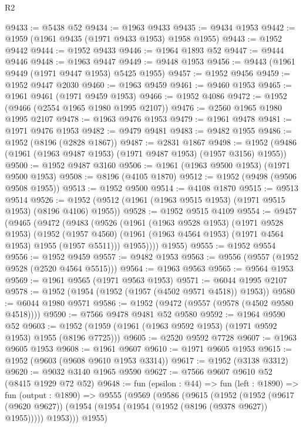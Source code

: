 \begin{lexlean}{R2}
\begin{coremodule}
@9433 := @5438 @52
@9434 := @1963 @9433
@9435 := @9434 @1953
@9442 := @1959 (@1961 @9435 (@1971 @9433 @1953) @1958 @1955)
@9443 := @1952 @9442
@9444 := @1952 @9433
@9446 := @1964 @1893 @52
@9447 := @9444 @9446
@9448 := @1963 @9447
@9449 := @9448 @1953
@9456 := @9443 (@1961 @9449 (@1971 @9447 @1953) @5425 @1955)
@9457 := @1952 @9456
@9459 := @1952 @9447 @2030
@9460 := @1963 @9459
@9461 := @9460 @1953
@9465 := @1961 @9461 (@1971 @9459 @1953)
@9466 := @1952 @4086
@9472 := @1952 (@9466 (@2554 @1965 @1980 @1995 @2107))
@9476 := @2560 @1965 @1980 @1995 @2107
@9478 := @1963 @9476 @1953
@9479 := @1961 @9478
@9481 := @1971 @9476 @1953
@9482 := @9479 @9481
@9483 := @9482 @1955
@9486 := @1952 (@8196 (@2828 @1867))
@9487 := @2831 @1867
@9498 := @1952 (@9486 (@1961 (@1963 @9487 @1953) (@1971 @9487 @1953) (@1957 @3156) @1955))
@9500 := @1952 @9487 @3160
@9506 := @1961 (@1963 @9500 @1953) (@1971 @9500 @1953)
@9508 := @8196 (@4105 @1870)
@9512 := @1952 (@9498 (@9506 @9508 @1955))
@9513 := @1952 @9500
@9514 := @4108 @1870
@9515 := @9513 @9514
@9526 := @1952 (@9512 (@1961 (@1963 @9515 @1953) (@1971 @9515 @1953) (@8196 @4106) @1955))
@9528 := @1952 @9515 @4109
@9554 := @9457
    (@9465
      (@9472
        (@9483
          (@9526
            (@1961
              (@1963 @9528 @1953)
              (@1971 @9528 @1953)
              (@1952
                (@1957 @4560)
                (@1961 (@1963 @4564 @1953) (@1971 @4564 @1953) @1955 (@1957 @5511)))
              @1955))))
      @1955)
@9555 := @1952 @9554
@9556 := @1952 @9459
@9557 := @9482 @1953
@9563 := @9556 (@9557 (@1952 @9528 (@2520 @4564 @5515)))
@9564 := @1963 @9563
@9565 := @9564 @1953
@9569 := @1961 @9565 (@1971 @9563 @1953)
@9571 := @6044 @1995 @2107
@9578 := @1952 (@1954 (@1952 (@1957 (@4502 @9571 @4518)) @1953))
@9580 := @6044 @1980 @9571
@9586 := @1952 (@9472 (@9557 (@9578 (@4502 @9580 @4518))))
@9590 := @7566 @9478 @9481 @52 @9580
@9592 := @1964 @9590 @52
@9603 := @1952 (@1959 (@1961 (@1963 @9592 @1953) (@1971 @9592 @1953) @1955 (@8196 @7725)))
@9605 := @2520 @9592 @7728
@9607 := @1963 @9605 @1953
@9608 := @1961 @9607
@9610 := @1971 @9605 @1953
@9615 := @1952 (@9603 (@9608 @9610 @1953 @3314))
@9617 := @1952 (@3138 @3312)
@9620 := @9032 @3140 @1965 @9590
@9627 := @7566 @9607 @9610 @52 (@8415 @1929 @72 @52)
@9648 := fun (epsilon : @44) =>
  fun (left : @1890) =>
  fun (output : @1890) =>
  @9555
    (@9569
      (@9586
        (@9615
          (@1952
            (@1952
              (@9617 (@9620 @9627))
              (@1954 (@1954 (@1954 (@1952 (@8196 (@9378 @9627)) @1955)))))
            @1953)))
      @1955)

\end{coremodule}
\end{lexlean}
